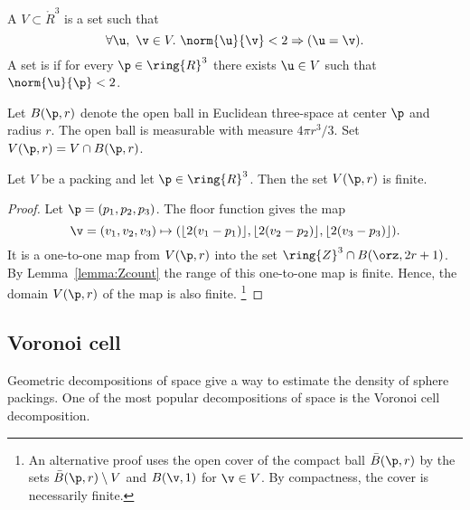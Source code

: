 \begin{definition} 
A  $ V\subset \ring{R}^3$ is a set such that
\[ 
\forall  \u,~\v\in  V.~  \norm{ \u}{\v} < 2 \Rightarrow ( \u=\v).
\]  
A set is  if for every $\p\in\ring{R}^3$ there
exists $ \u\in V$ such that $\norm{ \u}{\p}< 2$.
\end{definition}
%
%



Let $B(\p,r)$ denote the open ball in
Euclidean three-space at center $\p$ and radius $r$.  The open ball
is measurable with measure $4\pi r^3/3$.
 Set $ V(\p,r) = V \cap
B(\p,r)$. %
%
%

\begin{lemma}[]
\label{lemma:V-finite}
Let $ V$ be a packing and let $\p\in\ring{R}^3$.
Then the set $ V(\p,r)$ is finite.
\end{lemma}

\begin{proof}  Let $\p = (p_1,p_2,p_3)$. The floor function gives the map
\[ \v=(v_1,v_2,v_3)\mapsto (\lfloor 2(v_1-p_1)
  \rfloor, \lfloor 2(v_2-p_2) \rfloor, \lfloor 2(v_3-p_3) \rfloor).
\] 
It is a one-to-one map from $ V(\p,r)$ into the set $\ring{Z}^3\cap
B(\orz,2r + 1)$.  By Lemma~\ref{lemma:Zcount} the range of this
one-to-one map is finite.  Hence, the domain $ V(\p,r)$ of the map is
also finite.%
\footnote{An alternative proof uses the open cover of the compact ball
  $\bar B(\p,r)$ by the sets $\bar B(\p,r)\setminus V$ and $B(\v,1)$
  for $\v\in V$. By compactness, the cover is necessarily finite.}
\end{proof}
%






\subsection{Voronoi cell}

Geometric decompositions of space give a way to estimate the density
of sphere packings.  One of the most popular decompositions of space
is the Voronoi cell decomposition.

